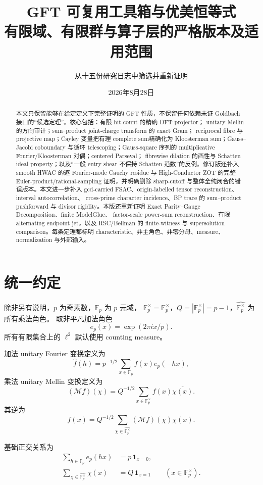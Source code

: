 \documentclass[11pt,a4paper]{ctexart}
\title{GFT 可复用工具箱与优美恒等式\\
\large 有限域、有限群与算子层的严格版本及适用范围}
\author{从十五份研究日志中筛选并重新证明}
\date{2026年8月28日}
\theoremstyle{definition}
\newcommand{\F}{\mathbb F}
\newcommand{\G}{\F_p^\times}
\newcommand{\Gh}{\widehat{\G}}
\newcommand{\ep}{e_p}
\newcommand{\1}{\mathbf 1}
\begin{document}
\maketitle
\sloppy

\begin{abstract}
本文只保留能够在给定定义下完整证明的 GFT 性质，不保留任何依赖未证
Goldbach 接口的“候选定理”。核心包括：有限 hit-count 的精确 DFT projector；
unitary Mellin 的方向审计；sum--product joint-charge transform 的 exact Gram；
reciprocal fibre 与 projective map；Cayley 变量把有理 complete sum精确化为
Kloosterman sum；Gauss--Jacobi coboundary 与循环 telescoping；Gauss-square
序列的 multiplicative Fourier/Kloosterman 对偶；centered Parseval；
fibrewise dilation 的酉性与 Schatten ideal property；以及“一般 entry shear
不保持 Schatten 范数”的反例。修订版还补入 smooth HWAC 的逐 Fourier-mode
Cauchy residue 与 High-Conductor ZOT 的完整 Euler-product/rational-sampling
证明，并明确删除 sharp-cutoff 与整体全纯闭合的错误版本。本文进一步补入
gcd-carried FSAC、origin-labelled tensor reconstruction、interval autocorrelation、
cross-prime character incidence、BP trace 的 sum--product pushforward 与 divisor
rigidity。本版还重新证明 Exact Parity--Gauge Decomposition、finite ModelGlue、
factor-scale power-sum reconstruction、有限 alternating endpoint jet，以及
RSC/Bellman 的 finite-witness 与 supersolution comparison。每条定理都标明 characteristic、非主角色、非零分母、measure、
normalization 与外部输入。
\end{abstract}

\section{统一约定}

除非另有说明，$p$ 为奇素数，$\F_p$ 为 $p$ 元域，
$\G=\F_p^\times$，$Q=|\G|=p-1$，$\Gh$ 为所有乘法角色。
取非平凡加法角色
\[
\ep(x)=\exp(2\pi i x/p).
\]
所有有限集合上的 $\ell^2$ 默认使用 counting measure。

加法 unitary Fourier 变换定义为
\[
\widehat f(h)=p^{-1/2}\sum_{x\in\F_p}f(x)\ep(-hx),
\tag{1.1}
\]
乘法 unitary Mellin 变换定义为
\[
(\mathcal M f)(\chi)=Q^{-1/2}\sum_{x\in\G}f(x)\overline{\chi(x)}.
\tag{1.2}
\]
其逆为
\[
f(x)=Q^{-1/2}\sum_{\chi\in\Gh}(\mathcal Mf)(\chi)\chi(x).
\tag{1.3}
\]

基础正交关系为
\begin{align}
\sum_{h\in\F_p}\ep(hx)&=p\,\1_{x=0},                 \tag{1.4}\\
\sum_{\chi\in\Gh}\chi(x)&=Q\,\1_{x=1}\qquad(x\in\G). \tag{1.5}
\end{align}
\end{document}
